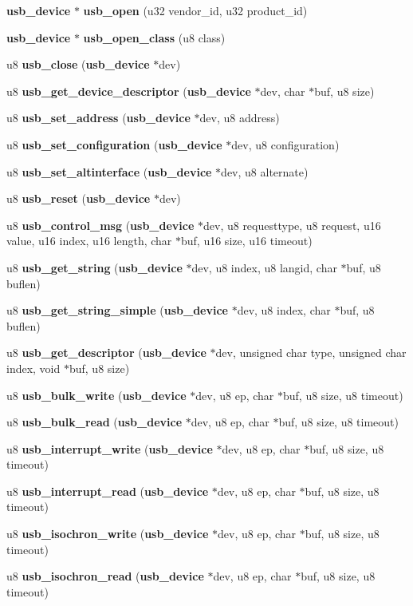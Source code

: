\begin{CompactItemize}
\item 
{\bf usb\_\-device} $\ast$ {\bf usb\_\-open} (u32 vendor\_\-id, u32 product\_\-id)
\item 
{\bf usb\_\-device} $\ast$ {\bf usb\_\-open\_\-class} (u8 class)
\item 
u8 {\bf usb\_\-close} ({\bf usb\_\-device} $\ast$dev)
\item 
u8 {\bf usb\_\-get\_\-device\_\-descriptor} ({\bf usb\_\-device} $\ast$dev, char $\ast$buf, u8 size)
\item 
u8 {\bf usb\_\-set\_\-address} ({\bf usb\_\-device} $\ast$dev, u8 address)
\item 
u8 {\bf usb\_\-set\_\-configuration} ({\bf usb\_\-device} $\ast$dev, u8 configuration)
\item 
u8 {\bf usb\_\-set\_\-altinterface} ({\bf usb\_\-device} $\ast$dev, u8 alternate)
\item 
u8 {\bf usb\_\-reset} ({\bf usb\_\-device} $\ast$dev)
\item 
u8 {\bf usb\_\-control\_\-msg} ({\bf usb\_\-device} $\ast$dev, u8 requesttype, u8 request, u16 value, u16 index, u16 length, char $\ast$buf, u16 size, u16 timeout)
\item 
u8 {\bf usb\_\-get\_\-string} ({\bf usb\_\-device} $\ast$dev, u8 index, u8 langid, char $\ast$buf, u8 buflen)
\item 
u8 {\bf usb\_\-get\_\-string\_\-simple} ({\bf usb\_\-device} $\ast$dev, u8 index, char $\ast$buf, u8 buflen)
\item 
u8 {\bf usb\_\-get\_\-descriptor} ({\bf usb\_\-device} $\ast$dev, unsigned char type, unsigned char index, void $\ast$buf, u8 size)
\item 
u8 {\bf usb\_\-bulk\_\-write} ({\bf usb\_\-device} $\ast$dev, u8 ep, char $\ast$buf, u8 size, u8 timeout)
\item 
u8 {\bf usb\_\-bulk\_\-read} ({\bf usb\_\-device} $\ast$dev, u8 ep, char $\ast$buf, u8 size, u8 timeout)
\item 
u8 {\bf usb\_\-interrupt\_\-write} ({\bf usb\_\-device} $\ast$dev, u8 ep, char $\ast$buf, u8 size, u8 timeout)
\item 
u8 {\bf usb\_\-interrupt\_\-read} ({\bf usb\_\-device} $\ast$dev, u8 ep, char $\ast$buf, u8 size, u8 timeout)
\item 
u8 {\bf usb\_\-isochron\_\-write} ({\bf usb\_\-device} $\ast$dev, u8 ep, char $\ast$buf, u8 size, u8 timeout)
\item 
u8 {\bf usb\_\-isochron\_\-read} ({\bf usb\_\-device} $\ast$dev, u8 ep, char $\ast$buf, u8 size, u8 timeout)
\end{CompactItemize}


